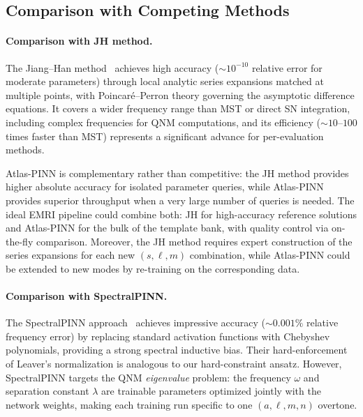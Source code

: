 \documentclass[aps,prd,twocolumn,superscriptaddress,nofootinbib]{revtex4-2}
\begin{document}
\subsection{Comparison with Competing Methods}

\paragraph{Comparison with JH method.}  The Jiang--Han method~\cite{Jiang:2025jh}
achieves high accuracy ($\sim 10^{-10}$ relative error for moderate parameters)
through local analytic series expansions matched at multiple points, with
Poincar\'{e}--Perron theory governing the asymptotic difference equations.  It
covers a wider frequency range than MST or direct SN integration, including
complex frequencies for QNM computations, and its efficiency ($\sim 10$--$100$
times faster than MST) represents a significant advance for per-evaluation
methods.

Atlas-PINN is complementary rather than competitive: the JH method provides
higher absolute accuracy for isolated parameter queries, while Atlas-PINN
provides superior throughput when a very large number of queries is needed.
The ideal EMRI pipeline could combine both: JH for high-accuracy reference
solutions and Atlas-PINN for the bulk of the template bank, with quality control
via on-the-fly comparison.  Moreover, the JH method requires expert construction
of the series expansions for each new $(s,\ell,m)$ combination, while Atlas-PINN
could be extended to new modes by re-training on the corresponding data.

\paragraph{Comparison with SpectralPINN.}  The SpectralPINN
approach~\cite{Pombo:2025tbyd} achieves impressive accuracy ($\sim 0.001\%$
relative frequency error) by replacing standard activation functions with
Chebyshev polynomials, providing a strong spectral inductive bias.  Their
hard-enforcement of Leaver's normalization is analogous to our hard-constraint
ansatz.  However, SpectralPINN targets the QNM \emph{eigenvalue} problem: the
frequency $\omega$ and separation constant $\lambda$ are trainable parameters
optimized jointly with the network weights, making each training run specific
to one $(a,\ell,m,n)$ overtone.
\end{document}
